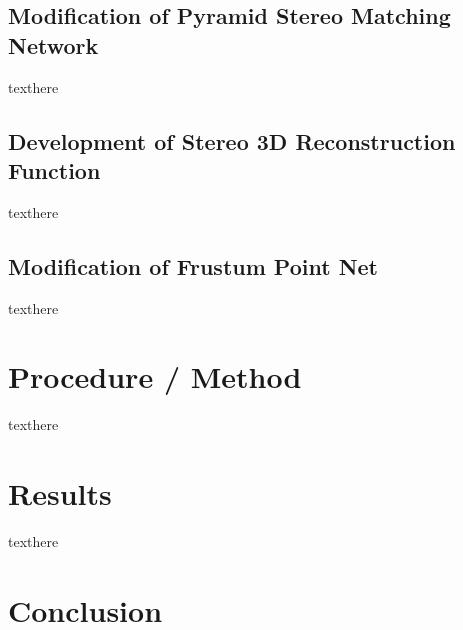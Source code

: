 \subsection{Modification of Pyramid Stereo Matching Network}
texthere

\subsection{Development of Stereo 3D Reconstruction Function}
texthere

\subsection{Modification of Frustum Point Net}
texthere

\section{Procedure / Method}
texthere

\section{Results}
texthere

\section{Conclusion}


